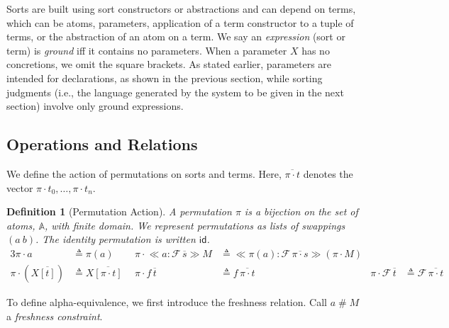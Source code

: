 \documentclass[11pt,a4paper]{amsart}
\newtheorem{definition}{Definition}
\newcounter{s}
\newcommand{\absterm}[2]{\ensuremath{\ll\!\!#1\!\!\gg #2}}
\newcommand{\concr}[2]{#1[#2]}
\newcommand{\vect}[1]{\ensuremath{\overline{#1}}}
\newcommand{\sconstr}[2]{\ensuremath{#1\,#2}}
\newcommand {\deffont}  [1] {\emph{#1}}
\newcommand {\id}       [0] {\mathsf{id}}
\newcommand {\act}      [0] {\cdot}
\newcommand {\prmAct}   [2] {#1 \act #2}
\newcommand{\varTrmD} [3] {\ensuremath{#3}} %
\newcommand {\susp}    [2] {\ifthenelse{\isempty{#1}}
                                       {\ifthenelse{\isempty{#2}}{}{#2}}
                                       {\ifthenelse{\isempty{#2}}{#1}{#1  | #2}}}
\newcommand {\prmCat}   [2] {#1 \mathrel{\circ} #2}
\newcommand {\hsh}      [0] {\#}
\newcommand {\frsh}    [0] {\mathrel{\hsh}}
\begin{document}
Sorts are built using sort constructors or abstractions and can depend
on terms, which can be atoms, parameters, application of a term constructor to a
tuple of terms, or the abstraction of an atom on a term.
We say an \emph{expression} (sort or term) is \emph{ground} iff it contains no parameters. When a parameter $X$ has no concretions, we omit the square brackets. As stated earlier, parameters are intended for declarations, as shown in the previous section, while sorting judgments (i.e., the language generated by the system to be given in the next section) involve only ground expressions.


\subsection{Operations and Relations}
We define the action of permutations on sorts and terms. Here, $\vect{\prmAct{\pi}{t}}$ denotes 
the vector $\prmAct{\pi}{t_0},\ldots,\prmAct{\pi}{t_n}$.

\begin{definition}[Permutation Action]
  \label{dependent:permutation_action}
  A \emph{permutation} $\pi$ is a bijection on the set of atoms, $\mathbb{A}$, with finite domain.
We represent permutations as lists of swappings  $(a\ b)$. The identity permutation is written $\id$.
  \begin{alignat*}{3}
\prmAct{\pi}{a} & \triangleq \pi(a)
&
\prmAct{\pi}{\absterm{a:\sconstr{\mathcal{F}}{\vect{s}}}{M}} & \triangleq \absterm{\pi(a):\sconstr{\mathcal{F}}{\vect{\pi\act s}}}{(\prmAct{\pi}{M})} 
\\
\prmAct{\pi}{(\varTrmD{\vartheta}{\pi'}{X} \vect{\concr{}{t
    }})} & \triangleq \varTrmD{\prmAct{\pi}{\vartheta}}{(\prmCat{\pi}{\pi'})}{X}\vect{\concr{}{\prmAct{\pi}{t}
}} \ \ &
\prmAct{\pi}{\sconstr{f}{\vect{t}} } & \triangleq \sconstr{f}{\vect{\prmAct{\pi}{t}}}
&
\prmAct{\pi}{\sconstr{\mathcal{F}}{\vect{t}}} & \triangleq \sconstr{\mathcal{F}}{\vect{\pi\act t}}
\end{alignat*}
\end{definition}

\noindent
To define alpha-equivalence, we first introduce the freshness relation. Call $a \frsh M$ a \deffont{freshness constraint}.
\end{document}
